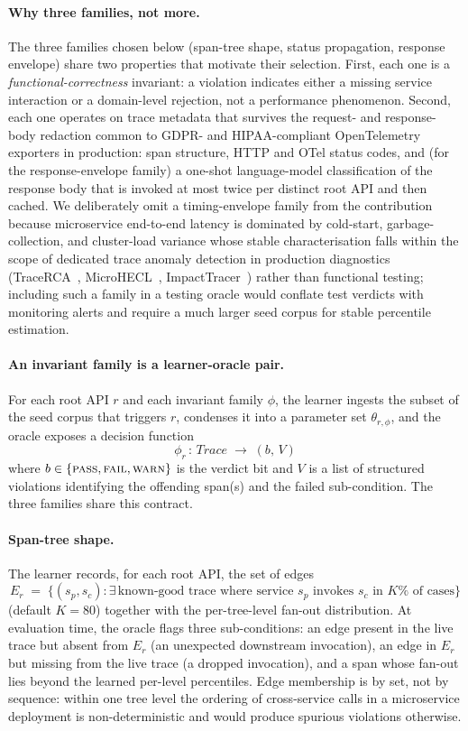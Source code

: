 \documentclass[conference]{IEEEtran}
\begin{document}
\paragraph{Why three families, not more.}
The three families chosen below (span-tree shape, status propagation, response envelope) share two properties that motivate their selection.  First, each one is a \emph{functional-correctness} invariant: a violation indicates either a missing service interaction or a domain-level rejection, not a performance phenomenon.  Second, each one operates on trace metadata that survives the request- and response-body redaction common to GDPR- and HIPAA-compliant OpenTelemetry exporters in production: span structure, HTTP and OTel status codes, and (for the response-envelope family) a one-shot language-model classification of the response body that is invoked at most twice per distinct root API and then cached.  We deliberately omit a timing-envelope family from the contribution because microservice end-to-end latency is dominated by cold-start, garbage-collection, and cluster-load variance whose stable characterisation falls within the scope of dedicated trace anomaly detection in production diagnostics (TraceRCA~\cite{li2021tracerca}, MicroHECL~\cite{liu2021microhecl}, ImpactTracer~\cite{xie2023impacttracer}) rather than functional testing; including such a family in a testing oracle would conflate test verdicts with monitoring alerts and require a much larger seed corpus for stable percentile estimation.

\paragraph{An invariant family is a learner-oracle pair.}
For each root API $r$ and each invariant family $\phi$, the learner ingests the subset of the seed corpus that triggers $r$, condenses it into a parameter set $\theta_{r,\phi}$, and the oracle exposes a decision function
\[
  \phi_{r}\,:\, \mathit{Trace} \;\to\; (b,\,V)
\]
where $b \in \{\textsc{pass}, \textsc{fail}, \textsc{warn}\}$ is the verdict bit and $V$ is a list of structured violations identifying the offending span(s) and the failed sub-condition. The three families share this contract.

\paragraph{Span-tree shape.}
The learner records, for each root API, the set of edges
\[
  E_r \;=\; \big\{(s_p, s_c) : \exists\,\text{known-good trace where service } s_p \text{ invokes } s_c \text{ in } K\% \text{ of cases}\big\}
\]
(default $K{=}80$) together with the per-tree-level fan-out distribution. At evaluation time, the oracle flags three sub-conditions: an edge present in the live trace but absent from $E_r$ (an unexpected downstream invocation), an edge in $E_r$ but missing from the live trace (a dropped invocation), and a span whose fan-out lies beyond the learned per-level percentiles. Edge membership is by set, not by sequence: within one tree level the ordering of cross-service calls in a microservice deployment is non-deterministic and would produce spurious violations otherwise.
\end{document}
